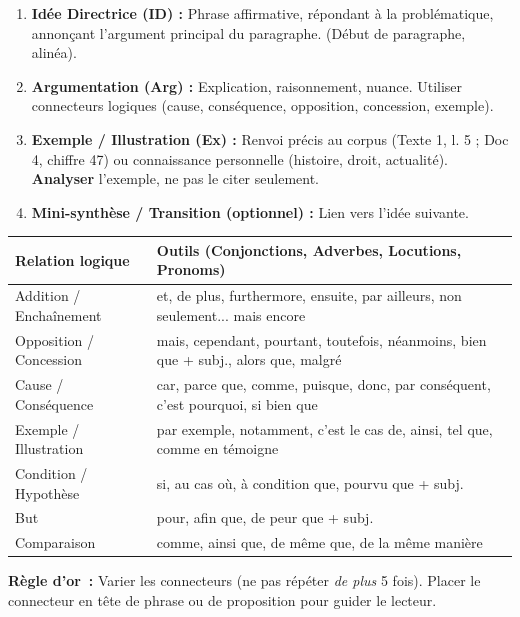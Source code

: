 \documentclass[11pt]{article}
\newcommand{\cle}[1]{{\popxbold\color{popdark}#1}}
\begin{document}
\begin{methode}
\begin{enumerate}
    \item \textbf{Idée Directrice (ID) :} Phrase affirmative, répondant à la problématique, annonçant l'argument principal du paragraphe. (Début de paragraphe, alinéa).
    \item \textbf{Argumentation (Arg) :} Explication, raisonnement, nuance. Utiliser \cle{connecteurs logiques} (cause, conséquence, opposition, concession, exemple).
    \item \textbf{Exemple / Illustration (Ex) :} Renvoi précis au corpus (Texte 1, l. 5 ; Doc 4, chiffre 47) ou connaissance personnelle (histoire, droit, actualité). \textbf{Analyser} l'exemple, ne pas le citer seulement.
    \item \textbf{Mini-synthèse / Transition (optionnel) :} Lien vers l'idée suivante.
\end{enumerate}
\end{methode}

\begin{propriete}
\begin{center}
\begin{tabularx}{\linewidth}{|l|X|}\hline
\rowcolor{popblueL} \textbf{Relation logique} & \textbf{Outils (Conjonctions, Adverbes, Locutions, Pronoms)} \\ \hline
\cle{Addition / Enchaînement} & et, de plus, furthermore, ensuite, par ailleurs, non seulement... mais encore \\ \hline
\cle{Opposition / Concession} & mais, cependant, pourtant, toutefois, néanmoins, bien que + subj., alors que, malgré \\ \hline
\cle{Cause / Conséquence} & car, parce que, comme, puisque, donc, par conséquent, c'est pourquoi, si bien que \\ \hline
\cle{Exemple / Illustration} & par exemple, notamment, c'est le cas de, ainsi, tel que, comme en témoigne \\ \hline
\cle{Condition / Hypothèse} & si, au cas où, à condition que, pourvu que + subj. \\ \hline
\cle{But} & pour, afin que, de peur que + subj. \\ \hline
\cle{Comparaison} & comme, ainsi que, de même que, de la même manière \\ \hline
\end{tabularx}
\end{center}
\textbf{Règle d'or~:} Varier les connecteurs (ne pas répéter \emph{de plus} 5 fois). Placer le connecteur en tête de phrase ou de proposition pour guider le lecteur.
\end{propriete}
\end{document}
